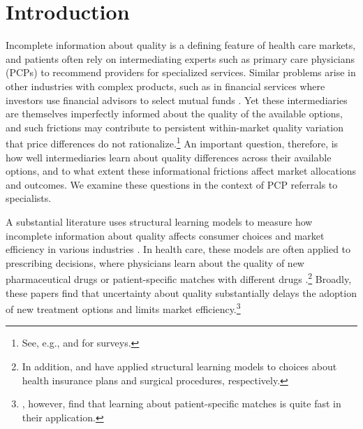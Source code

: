 \documentclass[12pt]{article}
\begin{document}
\clearpage
\newpage

\section{Introduction}
\label{sec:intro}

Incomplete information about quality is a defining feature of health care markets, and patients often rely on intermediating experts such as primary care physicians (PCPs) to recommend providers for specialized services. Similar problems arise in other industries with complex products, such as in financial services where investors use financial advisors to select mutual funds \citep*{gennaioli2015, linnainmaa2021}. Yet these intermediaries are themselves imperfectly informed about the quality of the available options, and such frictions may contribute to persistent within-market quality variation that price differences do not rationalize.\footnote{See, e.g., \cite{kolstad2009} and \cite{dranove2019} for surveys.} An important question, therefore, is how well intermediaries learn about quality differences across their available options, and to what extent these informational frictions affect market allocations and outcomes. We examine these questions in the context of PCP referrals to specialists.

A substantial literature uses structural learning models to measure how incomplete information about quality affects consumer choices and market efficiency in various industries \citep*[see][for surveys]{ching2013, ching2017}. In health care, these models are often applied to prescribing decisions, where physicians learn about the quality of new pharmaceutical drugs \citep*[e.g.,][]{coscelli2004, ching2010, ferreyra2011, chan2013} or patient-specific matches with different drugs \citep[e.g.,][]{crawford2005, dickstein2018}.\footnote{In addition, \cite*{chernew2008} and \cite{gong2018} have applied structural learning models to choices about health insurance plans and surgical procedures, respectively.} Broadly, these papers find that uncertainty about quality substantially delays the adoption of new treatment options and limits market efficiency.\footnote{\cite{crawford2005}, however, find that learning about patient-specific matches is quite fast in their application.}
\end{document}
